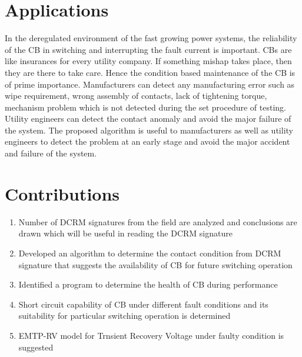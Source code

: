 \section{Applications}
In the deregulated environment of the fast growing power systems, the reliability of the CB in switching and interrupting the fault current is important. CBs are like insurances for every utility company. If something mishap takes place, then they are there to take care. Hence the condition based maintenance of the CB is of prime importance. Manufacturers can detect any manufacturing error such as wipe requirement, wrong assembly of contacts, lack of tightening torque, mechanism problem which is not detected during the set procedure of testing. Utility engineers can detect the contact anomaly and avoid the major failure of the system. The proposed algorithm is useful to manufacturers as well as utility engineers to detect the problem at an early stage and avoid the major accident and failure of the system.
\clearpage


\section{Contributions}
\begin{enumerate}
\item Number of DCRM signatures from the field are analyzed and conclusions are drawn which will be useful in reading the DCRM signature
\item Developed an algorithm to determine the contact condition from DCRM signature that suggests the availability of CB for future switching operation
\item Identified a program to determine the health of CB during performance
\item Short circuit capability of CB under different fault conditions and its suitability for particular switching operation is determined
\item EMTP-RV model for Trnsient Recovery Voltage under faulty condition is
suggested
\end{enumerate}
\clearpage